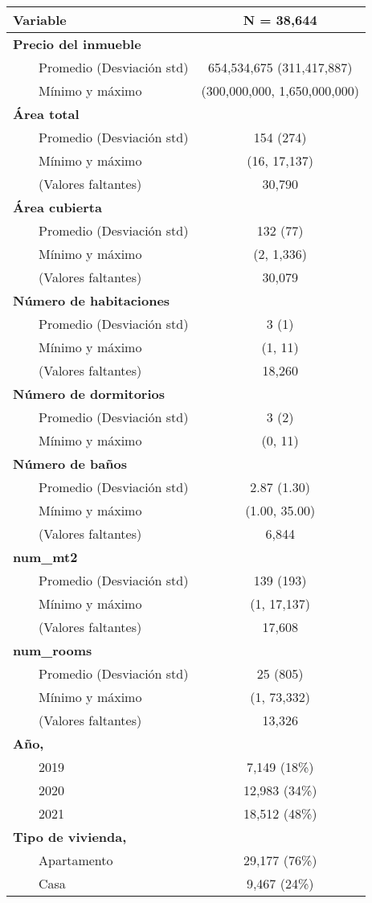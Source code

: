 \begin{longtable}{lc}
\toprule
\textbf{Variable} & \textbf{N = 38,644} \\ 
\midrule\addlinespace[2.5pt]
\textbf{Precio del inmueble} &  \\ 
    Promedio (Desviación std) & 654,534,675 (311,417,887) \\ 
    Mínimo y máximo & (300,000,000, 1,650,000,000) \\ 
\textbf{Área total} &  \\ 
    Promedio (Desviación std) & 154 (274) \\ 
    Mínimo y máximo & (16, 17,137) \\ 
    (Valores faltantes) & 30,790 \\ 
\textbf{Área cubierta} &  \\ 
    Promedio (Desviación std) & 132 (77) \\ 
    Mínimo y máximo & (2, 1,336) \\ 
    (Valores faltantes) & 30,079 \\ 
\textbf{Número de habitaciones} &  \\ 
    Promedio (Desviación std) & 3 (1) \\ 
    Mínimo y máximo & (1, 11) \\ 
    (Valores faltantes) & 18,260 \\ 
\textbf{Número de dormitorios} &  \\ 
    Promedio (Desviación std) & 3 (2) \\ 
    Mínimo y máximo & (0, 11) \\ 
\textbf{Número de baños} &  \\ 
    Promedio (Desviación std) & 2.87 (1.30) \\ 
    Mínimo y máximo & (1.00, 35.00) \\ 
    (Valores faltantes) & 6,844 \\ 
\textbf{num_mt2} &  \\ 
    Promedio (Desviación std) & 139 (193) \\ 
    Mínimo y máximo & (1, 17,137) \\ 
    (Valores faltantes) & 17,608 \\ 
\textbf{num_rooms} &  \\ 
    Promedio (Desviación std) & 25 (805) \\ 
    Mínimo y máximo & (1, 73,332) \\ 
    (Valores faltantes) & 13,326 \\ 
\textbf{Año, } &  \\ 
    2019 & 7,149  (18\%) \\ 
    2020 & 12,983  (34\%) \\ 
    2021 & 18,512  (48\%) \\ 
\textbf{Tipo de vivienda, } &  \\ 
    Apartamento & 29,177  (76\%) \\ 
    Casa & 9,467  (24\%) \\ 
\bottomrule
\end{longtable}

